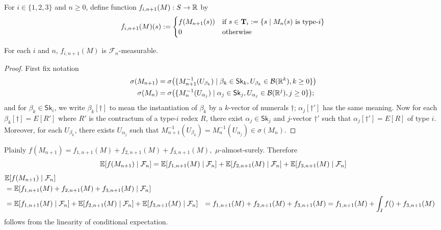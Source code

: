 \iffalse
For $i \in \{1, 2, 3\}$ and $n \geq 0$, define function $f_{i, n+1}(M) : S \to \mathbb{R}$ by
\[
f_{i, n+1}(M)(s) :=
\begin{cases}
f(M_{n+1}(s)) & \hbox{if }s \in \mathbf{T}_i := 
\{s \mid M_n(s) \textrm{ is type-$i$}\}\\
0 & \textrm{otherwise}
\end{cases}
\]
\begin{lemma}
\label{lem:inde}
For each $i$ and $n$, $f_{i, n+1}(M)$ is %
$\mathcal{F}_{n}$-measurable.
\end{lemma}

\begin{proof} First fix notation
\begin{align*}
\sigma(M_{n+1}) &= \sigma\big(\{M_{n+1}^{-1}(U_{\beta_k})
\mid \beta_k\in \mathsf{Sk}_k, U_{\beta_k} \in \mathcal{B}(\mathbb{R}^k), k \geq 0\}\big)\\
\sigma(M_{n}) &= \sigma\big(\{M_{n}^{-1}(U_{\alpha_j})
\mid \alpha_j\in \mathsf{Sk}_j, U_{\alpha_j} \in \mathcal{B}(\mathbb{R}^j), j \geq 0\}\big);
\end{align*}
and for $\beta_k \in \mathsf{Sk}_i$, we write $\beta_k[\dagger]$ to mean the instantiation of $\beta_k$ by a $k$-vector of numerals $\dagger$; $\alpha_j[\dagger']$ has the same meaning.
Now for each $\beta_k[\dagger] = E[R']$ where $R'$ is the contractum of a type-$i$ redex $R$, there exist $\alpha_j \in \mathsf{Sk}_j$ and $j$-vector $\dagger'$ such that $\alpha_j[\dagger'] = E[R]$ of type $i$.
Moreover, for each $U_{\beta_k}$, there exists $U_{\alpha_j}$ such that $M_{n+1}^{-1}(U_{\beta_k}) = M_{n}^{-1}(U_{\alpha_j}) \in \sigma(M_n)$.
\end{proof}

Plainly
\(
f(M_{n+1}) = %
f_{1, n+1}(M) + f_{2, n+1}(M) + f_{3, n+1}(M),
\)
$\mu$-almost-surely.
Therefore 
\[
\mathbb{E}[f(M_{n+1}) \mid \mathcal{F}_n] \nonumber \\
= 
\mathbb{E}[f_{1, n+1}(M) \mid \mathcal{F}_n] + \mathbb{E}[f_{2, n+1}(M) \mid \mathcal{F}_n] + \mathbb{E}[f_{3, n+1}(M) \mid \mathcal{F}_n] 
\]
\begin{align}
& \expect{f(M_{n+1}) \mid \mathcal{F}_n} \nonumber \\
& = \expect{f_{1, n+1}(M) + f_{2, n+1}(M) + f_{3, n+1}(M)  \mid \mathcal{F}_n} 
\nonumber \\
& = \expect{f_{1, n+1}(M) \mid \mathcal{F}_n} + \expect{f_{2, n+1}(M) \mid \mathcal{F}_n} + \expect{f_{3, n+1}(M) \mid \mathcal{F}_n} 
\label{eqn:linear cond ex} 
& = f_{1, n+1}(M) + f_{2, n+1}(M) + f_{3, n+1}(M)
\label{eqn:inde cond exp}
& = f_{1, n+1}(M) + \int_I f() + f_{3, n+1}(M) \label{eqn:inde cond exp} \\
\end{align}
 follows from the linearity of conditional expectation. 

